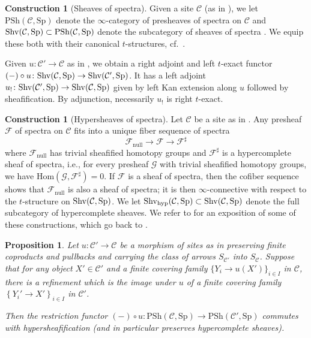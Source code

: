 \documentclass{amsart}
\newcommand{\sF}{\mathcal{F}}
\renewcommand{\sp}{\mathrm{Sp}}
\newcommand{\psh}{\mathrm{PSh}}
\newtheorem{proposition}[theorem]{Proposition}
\renewcommand{\hom}{\mathrm{Hom}}
\theoremstyle{definition}
\newtheorem{construction}[theorem]{Construction}
\begin{document}
\begin{construction}[Sheaves of spectra] 
Given a site $\mathcal{C}$ (as in 
), we let $\psh(\mathcal{C}, \sp)$ 
denote the $\infty$-category of presheaves of spectra on $\mathcal{C}$ and 
$\shv(\mathcal{C}, \sp) \subset \psh(\mathcal{C}, \sp)$ denote the 
subcategory of sheaves of spectra \cite[Sec.~1.3]{SAG}. 
We equip these both 
with their canonical $t$-structures, cf.~\cite[Sec.~1.3.2]{SAG}. 

Given $u \colon \mathcal{C}' \to \mathcal{C}$ as in , 
we obtain a right adjoint and left $t$-exact functor
$(-) \circ u \colon \shv(\mathcal{C}, \sp) \to \shv(\mathcal{C}', \sp)$. 
It has a left adjoint $u_! \colon \shv(\mathcal{C}', \sp) \to \shv(\mathcal{C},
\sp)$ 
given by left Kan extension along $u$ followed by sheafification. 
By adjunction, necessarily $u_!$ is right $t$-exact.  
\end{construction} 




\newcommand{\nl}{\mathrm{null}}
\newcommand{\shvh}{\mathrm{Shv}_{\mathrm{hyp}}}

\begin{construction}[Hypersheaves of spectra] 
Let $\mathcal{C}$ be a site as in . 
Any presheaf $\sF$ of spectra on $\mathcal{C}$ fits into a unique
fiber sequence
of spectra
\begin{equation}  \sF_{\nl} \to \sF \to \sF^{\sharp}
\label{hypcofib} \end{equation}
where $\sF_{\nl}$ has trivial sheafified homotopy groups 
and $\sF^{\sharp}$ is a
hypercomplete sheaf of spectra, i.e., for every presheaf $\mathcal{G}$ with
trivial sheafified homotopy groups, we have $\hom(\mathcal{G}, \sF^{\sharp}) =0
$. 
If $\sF$ is a sheaf of spectra, then the cofiber sequence shows that $\sF_{\nl}$
is also a sheaf of spectra; it is then $\infty$-connective with respect to the
$t$-structure on $\shv(\mathcal{C}, \sp)$. 
We let $\shvh( \mathcal{C}, \sp) \subset \shv(\mathcal{C}, \sp)$ denote 
the full subcategory of hypercomplete sheaves. 
We refer to \cite[Sec.~2]{CM19} for an exposition of some of these
constructions, which go back to \cite{Ja87, DHI04}. 
\end{construction} 

\begin{proposition} 
\label{commutewithhypersheaf}
Let $u \colon \mathcal{C}' \to \mathcal{C}$ be a morphism of sites as in 
preserving finite coproducts and  pullbacks and carrying the class of arrows
$S_{\mathcal{C}'}$ into $S_{\mathcal{C}}$. 
Suppose that 
for any object $X' \in \mathcal{C}'$ and a finite covering family $\{ Y_i \to
u(X')\}_{i \in I}$ in $\mathcal{C}$, 
there is a refinement which is the image under $u$ of a finite covering family 
$\left\{Y_i' \to X'\right\}_{i \in I}$ in $\mathcal{C}'$. 

Then the restriction functor 
$(-) \circ u \colon \psh(\mathcal{C}, \sp) \to \psh(\mathcal{C}', \sp)$ commutes with
hypersheafification (and in particular preserves hypercomplete sheaves). 
\end{proposition} 
\end{document}
